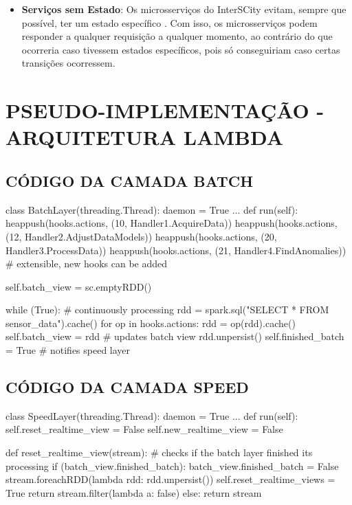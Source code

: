 \begin{apendicesenv}
\begin{itemize}
    \item \textbf{Serviços sem Estado}: Os microsserviços do InterSCity evitam,
sempre que possível, ter um estado específico \cite{delesposte2017}. Com isso,
os microsserviços podem responder a qualquer requisição a qualquer momento, ao
contrário do que ocorreria caso tivessem estados específicos, pois só
conseguiriam caso certas transições ocorressem.
\end{itemize}

\chapter{PSEUDO-IMPLEMENTAÇÃO - ARQUITETURA LAMBDA}
\label{appendix:impl}

\section{CÓDIGO DA CAMADA BATCH}
\begin{python}
class BatchLayer(threading.Thread):
    daemon = True
    ...
    def run(self):
        heappush(hooks.actions, (10, Handler1.AcquireData))
        heappush(hooks.actions, (12, Handler2.AdjustDataModels))
        heappush(hooks.actions, (20, Handler3.ProcessData))
        heappush(hooks.actions, (21, Handler4.FindAnomalies))
        # extensible, new hooks can be added

        self.batch_view = sc.emptyRDD()

        while (True):
            # continuously processing
            rdd = spark.sql("SELECT * FROM sensor_data").cache()
                for op in hooks.actions:
                rdd = op(rdd).cache()
            self.batch_view = rdd # updates batch view
            rdd.unpersist()
            self.finished_batch = True # notifies speed layer
\end{python}

\section{CÓDIGO DA CAMADA SPEED}
\begin{python}
class SpeedLayer(threading.Thread):
    daemon = True
    ...
    def run(self):
        self.reset_realtime_view = False
        self.new_realtime_view = False

        def reset_realtime_view(stream):
            # checks if the batch layer finished its processing
            if (batch_view.finished_batch):
                batch_view.finished_batch = False
                stream.foreachRDD(lambda rdd: rdd.unpersist())
                self.reset_realtime_views = True
                return stream.filter(lambda a: false)
            else:
                return stream


\end{python}
\end{apendicesenv}
